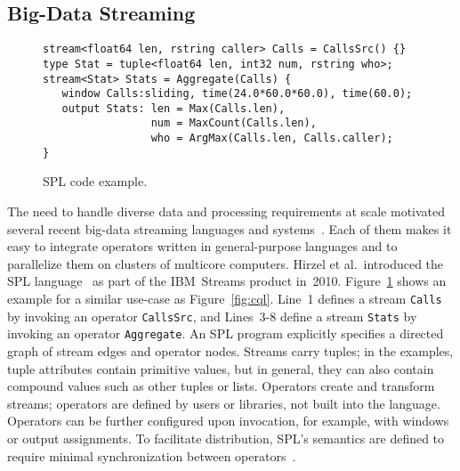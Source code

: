 \subsection{Big-Data Streaming}\label{sec:big} %

\begin{figure}[!h]
\begin{lstlisting}[xleftmargin=2mm,morekeywords={stream,float64,rstring,type,int32,window,output,tuple}]
stream<float64 len, rstring caller> Calls = CallsSrc() {}
type Stat = tuple<float64 len, int32 num, rstring who>;
stream<Stat> Stats = Aggregate(Calls) {
   window Calls:sliding, time(24.0*60.0*60.0), time(60.0);
   output Stats: len = Max(Calls.len),
                 num = MaxCount(Calls.len),
                 who = ArgMax(Calls.len, Calls.caller);
}
\end{lstlisting}
\vspace*{-4mm}
\caption{\label{fig:spl}SPL code example.}
\end{figure}

The need to handle diverse data and processing requirements at scale
motivated several recent big-data streaming languages and
systems~\cite{akidau_et_al_2013,carbone_et_al_2015,hirzel_schneider_gedik_2017,toshniwal_et_al_2014,zaharia_et_al_2013}.
Each of them makes it easy to integrate operators written in
general-purpose languages and to parallelize them on clusters of
multicore computers. Hirzel et al.\ introduced the \textsf{SPL}
language~\cite{hirzel_schneider_gedik_2017} as part of the \textsf{IBM~Streams}
product in~2010. Figure~\ref{fig:spl} shows an example for a similar
use-case as Figure~\ref{fig:cql}. Line~1 defines a stream
\lstinline{Calls} by invoking an operator \lstinline{CallsSrc}, and
\mbox{Lines 3-8} define a stream \lstinline{Stats} by invoking an
operator \lstinline{Aggregate}. An SPL program explicitly specifies a
directed graph of stream edges and operator nodes. Streams carry
tuples; in the examples, tuple attributes contain primitive values,
but in general, they can also contain compound values such as other
tuples or lists.  Operators create and transform streams; operators
are defined by users or libraries, not built into the
language. Operators can be further configured upon invocation, for
example, with windows or output assignments. To facilitate
distribution, SPL's semantics are defined to require minimal
synchronization between operators~\cite{soule_et_al_2016}.

